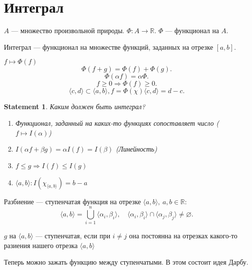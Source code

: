 \documentclass[11pt]{book}
\newcommand{\R}{\mathbb{R}}
\renewcommand{\le}{\leqslant}
\renewcommand{\ge}{\geqslant}
\theoremstyle{definition}
\theoremstyle{plain}
\theoremstyle{plain}
\newtheorem*{st}{Statement}
\theoremstyle{definition}
\theoremstyle{remark}
\begin{document}
\section{Интеграл}
\begin{defn}
    $ A$ --- множество произвольной природы. $ \Phi: A \to  \R$. $ \Phi$ --- функционал на $ A$.
\end{defn}
\begin{defn}
    Интеграл --- функционал на множестве функций, заданных на отрезке $ [a, b]$.

    $ f \mapsto \Phi (f)$
    \[
	\Phi(f+g) = \Phi(f) + \Phi(g)
    .\]
    \[
	\Phi( \alpha  f) = \alpha \Phi
    .\]
    \[
	f \ge  0 \Longrightarrow \Phi(f) \ge 0
    .\]
    \[
	\langle c, d \rangle \subset \langle a, b \rangle, f= \Phi(\chi)  \langle c, d \rangle = d - c
    .\]
\end{defn}
\begin{st}
    Каким должен быть интеграл?
    \begin{enumerate}
	\item Функционал, заданный на каких-то функциях сопоставляет число ($ f \mapsto I( \alpha )$)
	\item $ I( \alpha  f + \beta  g) = \alpha I(f) = I ( \beta ) $ (Линейность)
	\item $ f \le  g \Longrightarrow I(f) \le  I(g)$
	\item $  \langle a, b \rangle: I(\chi _{ \langle a, b \rangle} ) = b - a$
    \end{enumerate}
\end{st}
\begin{defn}
    Разбиение --- ступенчатая функция на отрезке $ \langle a, b \rangle, ~ a, b \in  \R:$
    \[
	\langle a, b \rangle = \bigcup_{i= 1}^{n} \langle \alpha _i, \beta _i \rangle, \quad \langle \alpha_i , \beta _i \rangle\cap \langle \alpha _j, \beta _j \rangle  \ne \varnothing
    .\]
\end{defn}
\begin{defn}
    $ g $  на $ \langle a, b \rangle$ --- ступенчатая, если при $ i \ne j$ она постоянна  на отрезках какого-то разиения нашего отрезка $ \langle a, b \rangle$
\end{defn}
Теперь можно зажать функцию между ступенчатыми. В этом состоит идея Дарбу.
\end{document}
